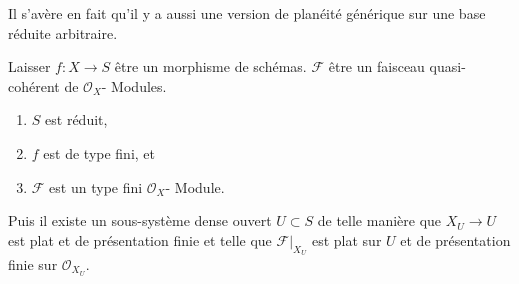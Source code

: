 \noindent
Il s'avère en fait qu'il y a aussi une version de planéité générique sur une base réduite arbitraire.

\begin{proposition}

\label{proposition-generic-flatness-reduced}

Laisser $f : X \to S$ être un morphisme de schémas. $\mathcal{F}$ être un faisceau quasi-cohérent de $\mathcal{O}_X$- Modules.

\begin{enumerate}

\item  $S$ est réduit,
\item  $f$ est de type fini, et
\item  $\mathcal{F}$ est un type fini $\mathcal{O}_X$- Module.

\end{enumerate}

Puis il existe un sous-système dense ouvert $U \subset S$ de telle manière que
$X_U \to U$ est plat et de présentation finie et telle que
$\mathcal{F}|_{X_U}$ est plat sur $U$ et de présentation finie sur $\mathcal{O}_{X_U}$.

\end{proposition}

